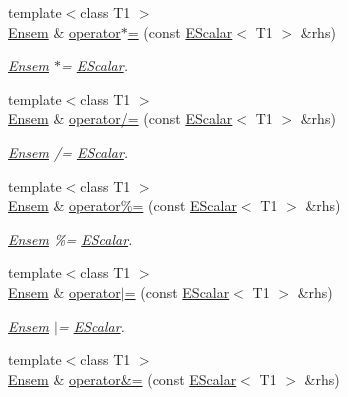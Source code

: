 \begin{DoxyCompactItemize}
{\footnotesize template$<$class T1 $>$ }\\\mbox{\hyperlink{classENSEM_1_1Ensem}{Ensem}} \& \mbox{\hyperlink{classENSEM_1_1Ensem_abacb93dfca393ddb29f317d35e2fff7f}{operator$\ast$=}} (const \mbox{\hyperlink{classENSEM_1_1EScalar}{E\+Scalar}}$<$ T1 $>$ \&rhs)
\begin{DoxyCompactList}\small\item\em \mbox{\hyperlink{classENSEM_1_1Ensem}{Ensem}} $\ast$= \mbox{\hyperlink{classENSEM_1_1EScalar}{E\+Scalar}}. \end{DoxyCompactList}\item 
{\footnotesize template$<$class T1 $>$ }\\\mbox{\hyperlink{classENSEM_1_1Ensem}{Ensem}} \& \mbox{\hyperlink{classENSEM_1_1Ensem_a32bf70c0844ce98695151457bf9df018}{operator/=}} (const \mbox{\hyperlink{classENSEM_1_1EScalar}{E\+Scalar}}$<$ T1 $>$ \&rhs)
\begin{DoxyCompactList}\small\item\em \mbox{\hyperlink{classENSEM_1_1Ensem}{Ensem}} /= \mbox{\hyperlink{classENSEM_1_1EScalar}{E\+Scalar}}. \end{DoxyCompactList}\item 
{\footnotesize template$<$class T1 $>$ }\\\mbox{\hyperlink{classENSEM_1_1Ensem}{Ensem}} \& \mbox{\hyperlink{classENSEM_1_1Ensem_a8f910ad50fa1625b535bd2456aa7ad64}{operator\%=}} (const \mbox{\hyperlink{classENSEM_1_1EScalar}{E\+Scalar}}$<$ T1 $>$ \&rhs)
\begin{DoxyCompactList}\small\item\em \mbox{\hyperlink{classENSEM_1_1Ensem}{Ensem}} \%= \mbox{\hyperlink{classENSEM_1_1EScalar}{E\+Scalar}}. \end{DoxyCompactList}\item 
{\footnotesize template$<$class T1 $>$ }\\\mbox{\hyperlink{classENSEM_1_1Ensem}{Ensem}} \& \mbox{\hyperlink{classENSEM_1_1Ensem_aa0c3f80e393be46c6f0a1cb3bbdfb170}{operator$\vert$=}} (const \mbox{\hyperlink{classENSEM_1_1EScalar}{E\+Scalar}}$<$ T1 $>$ \&rhs)
\begin{DoxyCompactList}\small\item\em \mbox{\hyperlink{classENSEM_1_1Ensem}{Ensem}} $\vert$= \mbox{\hyperlink{classENSEM_1_1EScalar}{E\+Scalar}}. \end{DoxyCompactList}\item 
{\footnotesize template$<$class T1 $>$ }\\\mbox{\hyperlink{classENSEM_1_1Ensem}{Ensem}} \& \mbox{\hyperlink{classENSEM_1_1Ensem_ab5e9900522968210e53ec66b09a402fe}{operator\&=}} (const \mbox{\hyperlink{classENSEM_1_1EScalar}{E\+Scalar}}$<$ T1 $>$ \&rhs)

\end{DoxyCompactItemize}
